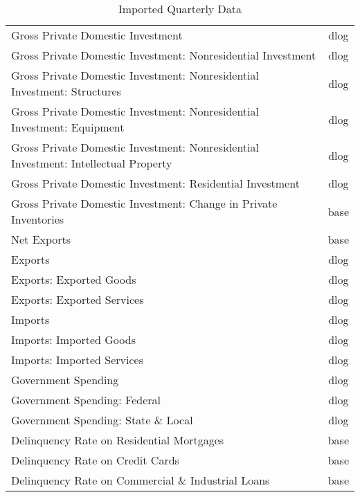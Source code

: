 \documentclass[11pt, letterpaper]{article}\usepackage[]{graphicx}\usepackage[]{color}
\begin{document}
\begin{table}[H]
\begin{tabular}{lc}
  Gross Private Domestic Investment & dlog \\ 
  Gross Private Domestic Investment: Nonresidential Investment & dlog \\ 
  Gross Private Domestic Investment: Nonresidential Investment: Structures & dlog \\ 
  Gross Private Domestic Investment: Nonresidential Investment: Equipment & dlog \\ 
  Gross Private Domestic Investment: Nonresidential Investment: Intellectual Property & dlog \\ 
  Gross Private Domestic Investment: Residential Investment & dlog \\ 
  Gross Private Domestic Investment: Change in Private Inventories & base \\ 
  Net Exports & base \\ 
  Exports & dlog \\ 
  Exports: Exported Goods & dlog \\ 
  Exports: Exported Services & dlog \\ 
  Imports & dlog \\ 
  Imports: Imported Goods & dlog \\ 
  Imports: Imported Services & dlog \\ 
  Government Spending & dlog \\ 
  Government Spending: Federal & dlog \\ 
  Government Spending: State \& Local & dlog \\ 
  Delinquency Rate on Residential Mortgages & base \\ 
  Delinquency Rate on Credit Cards & base \\ 
  Delinquency Rate on Commercial \& Industrial Loans & base \\ 
   \hline
\end{tabular}
\endgroup
\caption{Imported Quarterly Data} 
\end{table}
\end{document}

